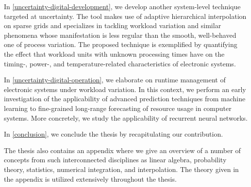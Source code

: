 In \cref{uncertainty-digital-development}, we develop another system-level
technique targeted at uncertainty. The tool makes use of adaptive hierarchical
interpolation on sparse grids and specializes in tackling workload variation and
similar phenomena whose manifestation is less regular than the smooth,
well-behaved one of process variation. The proposed technique is exemplified by
quantifying the effect that workload units with unknown processing times have on
the timing-, power-, and temperature-related characteristics of electronic
systems.

In \cref{uncertainty-digital-operation}, we elaborate on runtime management of
electronic systems under workload variation. In this context, we perform an
early investigation of the applicability of advanced prediction techniques from
machine learning to fine-grained long-range forecasting of resource usage in
computer systems. More concretely, we study the applicability of recurrent
neural networks.

In \cref{conclusion}, we conclude the thesis by recapitulating our contribution.

The thesis also contains an appendix where we give an overview of a number of
concepts from such interconnected disciplines as linear algebra, probability
theory, statistics, numerical integration, and interpolation. The theory given
in the appendix is utilized extensively throughout the thesis.
